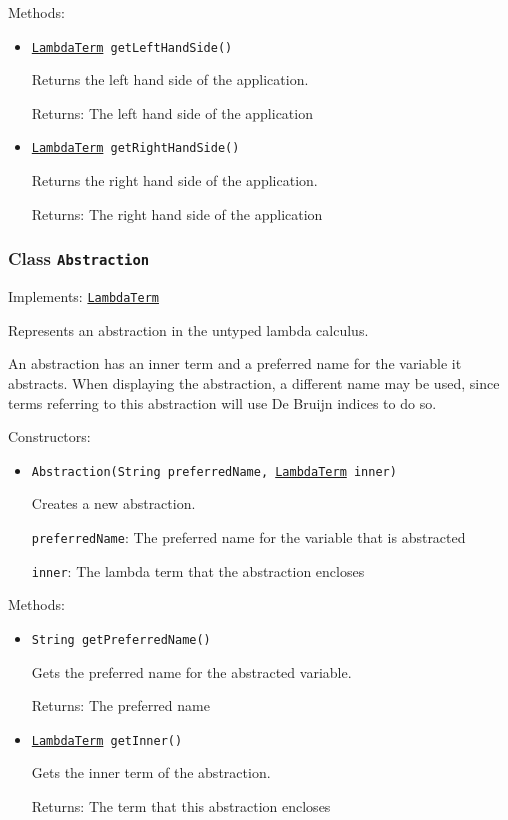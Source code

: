Methods:
\begin{itemize}
\item \texttt{\hyperref[type:edu.kit.wavelength.client.model.term.LambdaTerm]{LambdaTerm} getLeftHandSide()}

Returns the left hand side of the application.

Returns: The left hand side of the application

\item \texttt{\hyperref[type:edu.kit.wavelength.client.model.term.LambdaTerm]{LambdaTerm} getRightHandSide()}

Returns the right hand side of the application.

Returns: The right hand side of the application

\end{itemize}

\subsubsection{Class \texttt{Abstraction}}
\label{type:edu.kit.wavelength.client.model.term.Abstraction}
Implements: \texttt{\hyperref[type:edu.kit.wavelength.client.model.term.LambdaTerm]{LambdaTerm}}

Represents an abstraction in the untyped lambda calculus.
 
 An abstraction has an inner term and a preferred name for the
 variable it abstracts. When displaying the abstraction, a different
 name may be used, since terms referring to this abstraction
 will use De Bruijn indices to do so.

Constructors:
\begin{itemize}
\item \texttt{Abstraction(String preferredName, \hyperref[type:edu.kit.wavelength.client.model.term.LambdaTerm]{LambdaTerm} inner)}

Creates a new abstraction.

\texttt{preferredName}: The preferred name for the variable that is abstracted

\texttt{inner}: The lambda term that the abstraction encloses

\end{itemize}

Methods:
\begin{itemize}
\item \texttt{String getPreferredName()}

Gets the preferred name for the abstracted variable.

Returns: The preferred name

\item \texttt{\hyperref[type:edu.kit.wavelength.client.model.term.LambdaTerm]{LambdaTerm} getInner()}

Gets the inner term of the abstraction.

Returns: The term that this abstraction encloses

\end{itemize}

